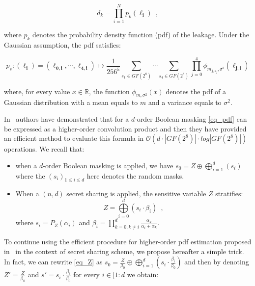 \documentclass{llncs}
\begin{document}
\begin{equation*}
d_k= \prod\limits_{i=1}^{N} p_{k}(\boldsymbol{\ell_i}) \enspace,
\end{equation*}    
 
where $p_k$ denotes the probability density function (pdf) of the leakage. Under the Gaussian assumption, the pdf satisfies:   

\begin{equation}
p_s : (\boldsymbol{\ell_i}) = (\boldsymbol{\ell_{0,i}}, \cdots, \boldsymbol{\ell_{4,i}}) \mapsto \frac{1}{256^5} \sum_{s_1 \in GF(2^8)} \cdots \sum_{s_4 \in GF(2^8)} \prod\limits_{j=0}^{4} \phi_{m_{j,s_j}, \sigma^2} (\boldsymbol{\ell_{j,i}})
\label{eq_pdf}
\end{equation} 
 
where, for every value $x \in \mathbb{R}$, the function $\phi_{m,\sigma^2}(x)$ denotes the pdf of a Gaussian distribution with a mean equals to $m$ and a variance equals to $\sigma^2$. 

In~\cite{LPRRT14} authors have demonstrated that for a $d$\myth-order Boolean masking \eqref{eq_pdf} can be expressed as a higher-order convolution product and then they have provided an efficient method to evaluate this formula in $ \mathcal{O}(d \cdot |GF(2^8)| \cdot log|GF(2^8)|)$ operations. 
We recall that:
\begin{itemize}
\item  when a $d$\myth-order Boolean masking is applied, we have $s_0= Z \oplus \bigoplus\limits_{i=1}^{d} (s_i)$ where the $(s_i)_{1 \le i \le d}$ here denotes the random masks.

\item When a $(n,d)$ secret sharing is applied, the sensitive variable $Z$ stratifies: 
\begin{equation}
Z=\bigoplus\limits_{i=0}^{d} (s_i \cdot \beta_i) \enspace,
\label{eq_Z}
\end{equation}
 where $s_i =P_Z(\alpha_i)$ and $\beta_i=\prod\limits_{k=0,k\neq i}^{d} \frac{\alpha_k}{\alpha_i+\alpha_k}$. 
\end{itemize}

To continue using the efficient procedure for higher-order pdf estimation proposed in~\cite{LPRRT14} in the context of secret sharing scheme, we propose hereafter a simple trick. In fact, we can rewrite \eqref{eq_Z} as $s_0=\frac{Z}{\beta_0}\oplus\bigoplus\limits_{i=1}^{d} (s_i \cdot \frac{\beta_i}{\beta_0})$ and then by denoting $Z'=\frac{Z}{\beta_0}$ and $s'=s_i \cdot \frac{\beta_i}{\beta_0}$ for every $i \in [ 1: d$ we obtain:
\end{document}
